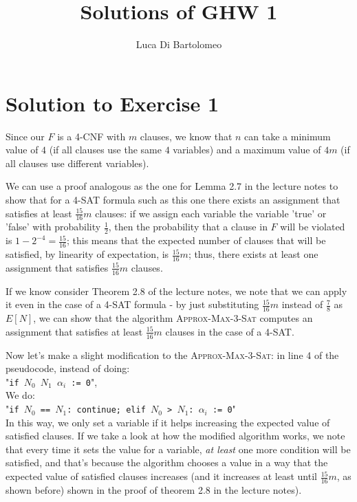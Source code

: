 \documentclass[a4paper,german]{article}
\title{Solutions of GHW 1}
\author{Luca Di Bartolomeo}
\date{}
\begin{document}
\maketitle

\section*{Solution to Exercise 1}

Since our $F$ is a 4-CNF with $m$ clauses, we know that $n$ can take a minimum
value of $4$ (if all clauses use the same $4$ variables) and a maximum value of
$4m$ (if all clauses use different variables).

We can use a proof analogous as the one for Lemma 2.7 in the lecture notes to
show that for a 4-SAT formula such as this one there exists an assignment that
satisfies at least $\frac{15}{16}m$ clauses: if we assign each variable the
variable 'true' or 'false' with probability $\frac{1}{2}$, then the probability
that a clause in $F$ will be violated is $1 - 2^{-4} = \frac{15}{16}$; this
means that the expected number of clauses that will be satisfied, by linearity
of expectation, is $\frac{15}{16}m$; thus, there exists at least one assignment that
satisfies $\frac{15}{16}m$ clauses.

If we know consider Theorem 2.8 of the lecture notes, we note that we can apply 
it even in the case of a 4-SAT formula - by just substituting $\frac{15}{16}m$ 
instead of $\frac{7}{8}$ as $E[N]$, we can show that the algorithm \textsc{Approx-Max-3-Sat} 
computes an assignment that satisfies at least $\frac{15}{16}m$ clauses in the case
of a 4-SAT.

Now let's make a slight modification to the \textsc{Approx-Max-3-Sat}: in line 4
of the pseudocode, instead of doing: \\
"\texttt{if $N_0$ \geq $N_1$ $\alpha_i$ := 0}", \\
We do: \\
"\texttt{if $N_0$ == $N_1$: continue; elif $N_0$ > $N_1$: $\alpha_i$ := 0}"\\
In this way, we only set a variable if it helps increasing the expected value of satisfied
clauses.
If we take a look at how the modified algorithm works, we note
that every time it sets the value for a variable, \emph{at least} one more condition
will be satisfied, and that's because the algorithm chooses a value in a way that
the expected value of satisfied clauses increases (and it increases at
least until $\frac{15}{16}m$, as shown before)
shown in the proof of theorem 2.8 in the lecture notes).
\end{document}
